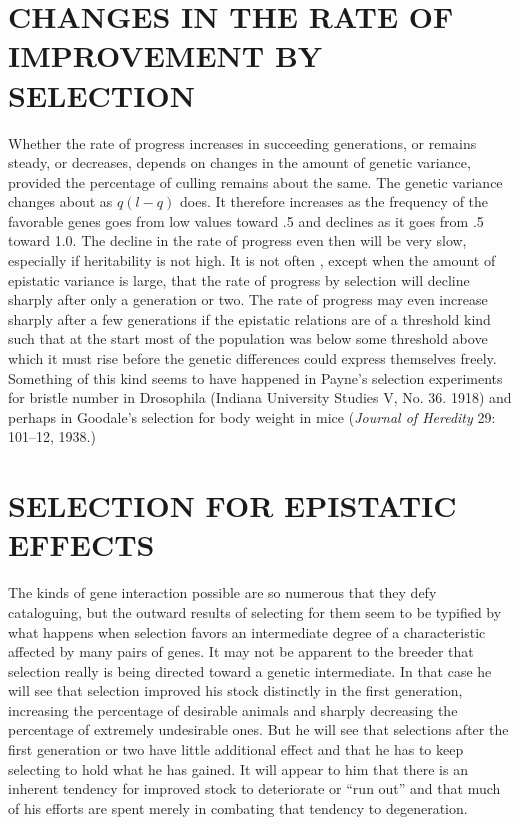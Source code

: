 \section*{CHANGES IN THE RATE OF IMPROVEMENT BY SELECTION}

Whether the rate of progress increases in succeeding generations, or
remains steady, or decreases, depends on changes in the amount of genetic
variance, provided the percentage of culling remains about the
same. The genetic variance changes about as $q(l - q)$ does. It therefore
increases as the frequency of the favorable genes goes from low
values toward .5 and declines as it goes from .5 toward 1.0. The decline
in the rate of progress even then will be very slow, especially if heritability
is not high. It is not often , except when the amount of epistatic
variance is large, that the rate of progress by selection will decline sharply
after only a generation or two. The rate of progress may even increase
sharply after a few generations if the epistatic relations are of a threshold
kind such that at the start most of the population was below some
threshold above which it must rise before the genetic differences could
express themselves freely. Something of this kind seems to have happened
in Payne's selection experiments for bristle number in Drosophila
(Indiana University Studies V, No. 36. 1918) and perhaps in Goodale's
selection for body weight in mice (\textit{Journal of Heredity} 29: 101--12,
1938.)

\section*{SELECTION FOR EPISTATIC EFFECTS}

The kinds of gene interaction possible are so numerous that they
defy cataloguing, but the outward results of selecting for them seem to
be typified by what happens when selection favors an intermediate
degree of a characteristic affected by many pairs of genes. It may not be
apparent to the breeder that selection really is being directed toward a
genetic intermediate. In that case he will see that selection improved
his stock distinctly in the first generation, increasing the percentage of
desirable animals and sharply decreasing the percentage of extremely
undesirable ones. But he will see that selections after the first generation
or two have little additional effect and that he has to keep selecting
to hold what he has gained. It will appear to him that there is an inherent
tendency for improved stock to deteriorate or ``run out'' and that
much of his efforts are spent merely in combating that tendency to
degeneration.

